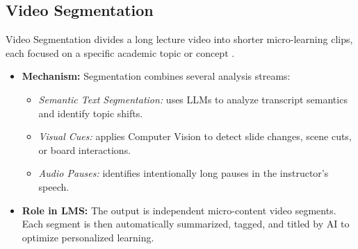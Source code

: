\subsection{Video Segmentation}
Video Segmentation divides a long lecture video into shorter
micro-learning clips, each focused on a specific academic topic or
concept \cite{galanopoulos2020lecture}.
\begin{itemize}
    \item \textbf{Mechanism:} Segmentation combines several analysis streams:
    \begin{itemize}
        \item \textit{Semantic Text Segmentation:} uses LLMs to analyze
              transcript semantics and identify topic shifts.
        \item \textit{Visual Cues:} applies Computer Vision to detect
              slide changes, scene cuts, or board interactions.
        \item \textit{Audio Pauses:} identifies intentionally long pauses
              in the instructor's speech.
    \end{itemize}
    \item \textbf{Role in LMS:} The output is independent micro-content
          video segments. Each segment is then automatically summarized,
          tagged, and titled by AI to optimize personalized learning.
\end{itemize}

